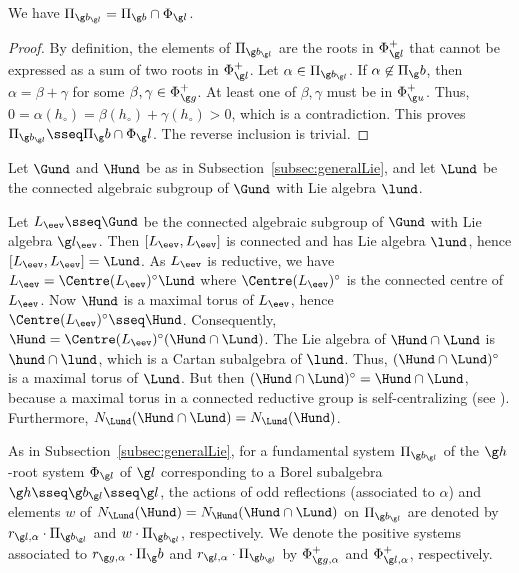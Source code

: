 \documentclass[12pt]{amsart}
\begin{document}
\begin{lem}
\label{lem:PiblPibr}
We have $\Pi_{\g b_{\g l}}=\Pi_{\g b}\cap\Phi_{\g l}$.
\end{lem}
\begin{proof}
By definition, the elements of $\Pi_{\g b_{\g l}}$ are the roots in $\Phi_{\g l}^+$ that cannot be expressed as a sum of two roots in $\Phi_{\g l}^+$. Let $\alpha\in\Pi_{\g b_{\g l}}$. If $\alpha\not\in\Pi_\g b$, then $\alpha=\beta+\gamma$ for some $\beta,\gamma\in\Phi_{\g g}^+$. At least one of $\beta,\gamma$ must be in $\Phi_{\g u}^+$. Thus,
$
0=\alpha(h_\circ)=\beta(h_\circ)+\gamma(h_\circ)>0
$,
which is a contradiction. This proves $\Pi_{\g b_{\g l}}\sseq \Pi_\g b\cap\Phi_\g l$. The reverse inclusion is trivial. 
\end{proof}
Let $\Gund$ and $\Hund$ be as in Subsection~\ref{subsec:generalLie}, and 
let $\Lund$ be the connected  algebraic subgroup of $\Gund$ with Lie algebra $\lund$.
\begin{rmk}
\label{rmk:Normalizers}
Let $L_\eev\sseq \Gund$ be the connected algebraic subgroup of $\Gund$ with Lie algebra $\g l_\eev$. Then  $[L_\eev,L_\eev]$ is connected and has Lie algebra $\lund$, hence 
$[L_\eev,L_\eev]=\Lund$.
As $L_\eev$ is reductive, we have   $L_\eev=\Centre(L_\eev)^\circ\Lund$ %
where  $\Centre(L_\eev)^\circ$ is the connected centre of $L_\eev$. Now $\Hund$ is a maximal torus of $L_\eev$, hence $\Centre(L_\eev)^\circ\sseq \Hund$.
Consequently, $\Hund=\Centre(L_\eev)^\circ(\Hund\cap \Lund)$. The Lie algebra of $\Hund\cap \Lund$ is $\hund\cap\lund$, which is a Cartan subalgebra of $\lund$. Thus, $(\Hund\cap \Lund)^\circ$ is a maximal torus of $\Lund$. But then  $(\Hund\cap \Lund)^\circ=\Hund\cap \Lund$, because a maximal torus in a connected reductive group is self-centralizing
(see \cite[Corollary 11.12]{Borel}).
Furthermore, 
$N_{\Lund}(\Hund\cap\Lund)=N_{\Lund}(\Hund)$.
\end{rmk}




As in Subsection~\ref{subsec:generalLie}, 
 for a fundamental system $\Pi_{\g b_{\g l}}$ of the $\g h$-root system $\Phi_{\g l}$ of $\g l$ corresponding to a Borel subalgebra $\g h\sseq \g b_{\g l}\sseq\g l$,  the actions of odd reflections (associated to $\alpha$) and elements $w$ of $N_{\Lund}(\Hund)=N_{\Hund}(\Hund\cap\Lund)$ on $\Pi_{\g b_{\g l}}$ are denoted by $r_{\g l,\alpha}\cdot \Pi_{\g b_{\g l}}$ and $w\cdot \Pi_{\g b_{\g l}}$, respectively. We denote the positive systems associated to $r_{\g g,\alpha}\cdot \Pi_\g b$ and $r_{\g l,\alpha}\cdot \Pi_{\g b_{\g l}}$ by $\Phi_{\g g,\alpha}^+$ and $\Phi_{\g l,\alpha}^+$, respectively. 
\end{document}
